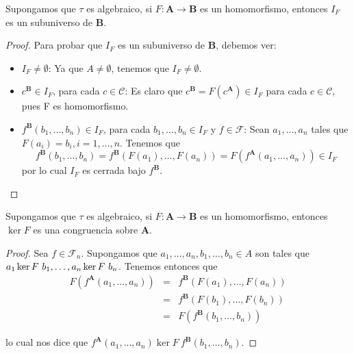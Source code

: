   \begin{lemma} \label{lemma_51}
    \PN Supongamos que $\tau$ es algebraico, si $F: \mathbf{A} \rightarrow \mathbf{B}$ es un homomorfismo, entonces
    $I_{F}$ es un subuniverso de $\mathbf{B}$.
  \end{lemma}
  \begin{proof}
    \PN Para probar que $I_{F}$ es un subuniverso de $\mathbf{B}$, debemos ver:
    \begin{itemize}
      \item $I_{F} \neq \emptyset$: Ya que $A \neq \emptyset$, tenemos que $I_{F} \neq \emptyset$.
      \item $c^{\mathbf{B}} \in I_{F}$, para cada $c \in \mathcal{C}$: Es claro que $c^{\mathbf{B}} = F(c^{\mathbf{A}})
        \in I_{F}$ para cada $c \in \mathcal{C}$, pues F es homomorfismo.
      \item $f^{\mathbf{B}}(b_{1}, \dotsc, b_{n}) \in I_{F}$, para cada $b_{1}, \dotsc, b_{n} \in I_{F}$ y $f \in
        \mathcal{F}$: Sean $a_{1}, \dotsc, a_{n}$ tales que $F(a_{i}) = b_{i}, i = 1, \dotsc, n$. Tenemos que
        \[
          f^{\mathbf{B}}(b_{1}, \dotsc, b_{n}) = f^{\mathbf{B}}(F(a_{1}), \dotsc, F(a_{n})) = F(f^{\mathbf{A}}(a_{1},
          \dotsc, a_{n})) \in I_{F}
        \]
        \PN por lo cual $I_{F}$ es cerrada bajo $f^{\mathbf{B}}$.
    \end{itemize}
  \end{proof}

  \begin{lemma} \label{lemma_52}
    \PN Supongamos que $\tau$ es algebraico, si $F: \mathbf{A} \rightarrow \mathbf{B}$ es un homomorfismo, entonces
    $\ker F$ es una congruencia sobre $\mathbf{A}$.
  \end{lemma}
  \begin{proof}
    \PN Sea $f \in \mathcal{F}_{n}$. Supongamos que $a_{1}, \dotsc, a_{n}, b_{1}, \dotsc, b_{n} \in A$ son tales que
    $a_{1} \ker F \ b_{1}, \dotsc, \linebreak a_{n} \ker F \ b_{n}$. Tenemos entonces que
    \begin{eqnarray*}
      F(f^{\mathbf{A}}(a_{1}, \dotsc, a_{n})) &=& f^{\mathbf{B}}(F(a_{1}), \dotsc, F(a_{n})) \\
      &=& f^{\mathbf{B}}(F(b_{1}), \dotsc, F(b_{n})) \\
      &=& F(f^{\mathbf{B}}(b_{1}, \dotsc, b_{n}))
    \end{eqnarray*}

    \PN lo cual nos dice que $f^{\mathbf{A}}(a_{1}, \dotsc, a_{n}) \ker F \ f^{\mathbf{B}}(b_{1}, \dotsc, b_{n})$.
  \end{proof}

